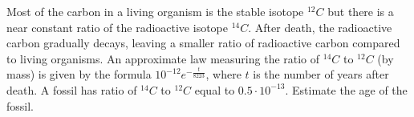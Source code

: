 \begin{frame}
\begin{example}
Most of the carbon in a living organism is the stable isotope ${}^{12}C $ but there is a near constant ratio of the radioactive isotope ${}^{14}C$. After death, the radioactive carbon gradually decays, leaving a smaller ratio of radioactive carbon compared to living organisms. An approximate law measuring the ratio of ${}^{14}C $ to ${}^{12}C $ (by mass) is given by the formula $10^{-12} e^{-\frac{t}{8223}}$, where $t$ is the number of years after death. A fossil has ratio of ${}^{14}C $ to ${}^{12}C $ equal to $0.5\cdot 10^{-13}$. Estimate the age of the fossil. 

\end{example}
\end{frame}